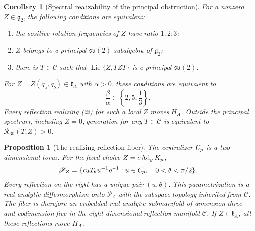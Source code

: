 \documentclass[10pt,a4paper]{amsart}
\newtheorem{corollary}{Corollary}
\newtheorem{proposition}{Proposition}
\newcommand{\Ad}{\operatorname{Ad}}
\newcommand{\Lie}{\operatorname{Lie}}
\begin{document}
\begin{corollary}[Spectral realizability of the principal obstruction]\label{cor:universal-spectral}
For a nonzero $Z\in\mathfrak g_2$, the following conditions are equivalent:
\begin{enumerate}[label=\textnormal{(\roman*)},leftmargin=9mm]
\item the positive rotation frequencies of $Z$ have ratio $1:2:3$;
\item $Z$ belongs to a principal $\mathfrak{su}(2)$ subalgebra of $\mathfrak g_2$;
\item there is $T\in\mathscr C$ such that $\Lie\{Z,TZT\}$ is a principal $\mathfrak{su}(2)$.
\end{enumerate}
For $Z=Z(q_a,q_b)\in\mathfrak k_A$ with $\alpha>0$, these conditions are equivalent to
\[
\frac{\beta}{\alpha}\in\left\{2,5,\frac13\right\}.
\]
Every reflection realizing (iii) for such a local $Z$ moves $H_A$.
Outside the principal spectrum, including $Z=0$, generation for any $T\in\mathscr C$ is equivalent to $\mathcal R_{30}(T,Z)>0$.
\end{corollary}

\begin{proposition}[The realizing-reflection fiber]\label{prop:principal-reflection-fiber}
The centralizer $C_{\rm p}$ is a two-dimensional torus.  For the fixed choice $Z=c\Ad_gK_{\rm p}$,
\[
\mathscr P_Z
 =\{g uT_\theta u^{-1}g^{-1}:u\in C_{\rm p},\quad 0<\theta<\pi/2\}.
\]
Every reflection on the right has a unique pair $(u,\theta)$.  This parametrization is a real-analytic diffeomorphism onto $\mathscr P_Z$ with the subspace topology inherited from $\mathscr C$.  The fiber is therefore an embedded real-analytic submanifold of dimension three and codimension five in the eight-dimensional reflection manifold $\mathscr C$.
If $Z\in\mathfrak k_A$, all these reflections move $H_A$.
\end{proposition}
\end{document}
